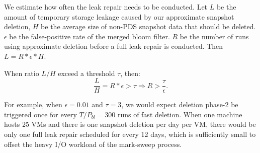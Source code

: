 We estimate how often the leak repair needs to be conducted.
Let $L$ be the amount of temporary storage leakage caused by our approximate snapshot deletion, 
$H$ be the average size of non-PDS snapshot data that should be deleted. 
$\epsilon$ be the false-positive rate of the merged bloom filter. 
$R$ be the number of runs using approximate deletion before a full leak repair is conducted.
Then $ L= R * \epsilon * H.  $


When ratio $L/H$ exceed a threshold $\tau$, then:
\[
\frac{L}{H} = R * \epsilon > \tau \Rightarrow R > \frac{\tau}{\epsilon}.
\]

For example, when $\epsilon = 0.01$ and $\tau=3$, 
we would expect deletion phase-2 be triggered once for 
every $T/P_{bl} = 300$ runs of fast deletion. 
When one machine hosts 25 VMs and there is one snapshot deletion per day per VM, there would be 
only one full leak repair scheduled for every 12 days, which is sufficiently small to offset the 
heavy I/O workload of the mark-sweep process.


